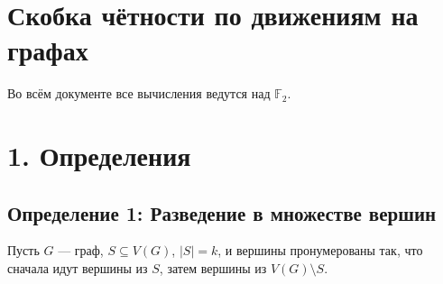 \documentclass[12pt,a4paper]{article}
\begin{document}
\vspace{2cm}

\section*{\centering Скобка чётности по движениям на графах}

\vspace{2cm}

Во всём документе все вычисления ведутся над $\mathbb F_2$.

\section*{1. Определения}

\subsection*{Определение 1: Разведение в множестве вершин}

Пусть $G$ --- граф, $S \subseteq V(G)$, $|S| = k$, и вершины пронумерованы так, что сначала идут вершины из $S$, затем вершины из $V(G)\setminus S$.
\end{document}
